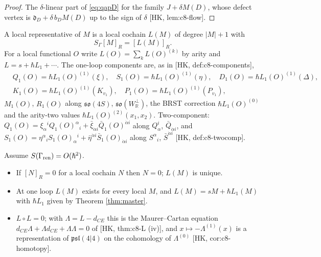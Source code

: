 \begin{proof}
The $\delta$-linear part of \eqref{eq:qapD} for the family $J+\delta M(D)$, whose defect vertex is $\mathfrak d_D+\delta\,b_DM(D)$ up to the sign of $\delta$ [HK, lem:c8-flow].
\end{proof}

\begin{definition}
\label{def:comp}
A local representative of $M$ is a local cochain $L(M)$ of degree $|M|+1$ with
\begin{equation}
S_\Gamma[M]_R=[L(M)]_R .
\label{eq:repD}
\end{equation}
For a local functional $O$ write $L(O)=\sum_kL(O)^{(k)}$ by arity and $L=s+\hbar L_1+\cdots$. The one-loop components are, as in [HK, def:c8-components],
\[
\begin{aligned}
&Q_1(O)=\hbar L_1(O)^{(1)}(\xi),\quad S_1(O)=\hbar L_1(O)^{(1)}(\eta),\quad D_1(O)=\hbar L_1(O)^{(1)}(\Delta),\\
&K_1(O)=\hbar L_1(O)^{(1)}(K_{v_1}),\quad P_1(O)=\hbar L_1(O)^{(1)}(P_{v_1}),
\end{aligned}
\]
$M_1(O)$, $R_1(O)$ along $\mathfrak{so}(4S)$, $\mathfrak{so}(W^\perp_{\mathbb R})$, the BRST correction $\hbar L_1(O)^{(0)}$ and the arity-two values $\hbar L_1(O)^{(2)}(x_1,x_2)$. Two-component: $Q_1(O)=\xi_\alpha{}^iQ_1(O)^\alpha{}_i+\bar\xi_{\dot\alpha i}\bar Q_1(O)^{\dot\alpha i}$ along $Q^i_\alpha$, $\bar Q_{\dot\alpha i}$, and $S_1(O)=\eta^\alpha{}_iS_1(O)_\alpha{}^i+\bar\eta^{\dot\alpha i}\bar S_1(O)_{\dot\alpha i}$ along $S^\alpha{}_i$, $\bar S^{\dot\alpha i}$ [HK, def:c8-twocomp].
\end{definition}

\begin{theorem}
\label{thm:wellposed}
Assume $S(\Gamma_{\rm ren})=O(\hbar^2)$.
\begin{itemize}
\item[(i)] If $[N]_R=0$ for a local cochain $N$ then $N=0$; $L(M)$ is unique.
\item[(ii)] At one loop $L(M)$ exists for every local $M$, and $L(M)=sM+\hbar L_1(M)$ with $\hbar L_1$ given by Theorem \ref{thm:master}.
\item[(iii)] $L\circ L=0$; with $\Lambda=L-d_{CE}$ this is the Maurer--Cartan equation $d_{CE}\Lambda+\Lambda d_{CE}+\Lambda\Lambda=0$ of [HK, thm:c8-L (iv)], and $x\mapsto-\Lambda^{(1)}(x)$ is a representation of $\mathfrak{psl}(4|4)$ on the cohomology of $\Lambda^{(0)}$ [HK, cor:c8-homotopy].
\end{itemize}
\end{theorem}


